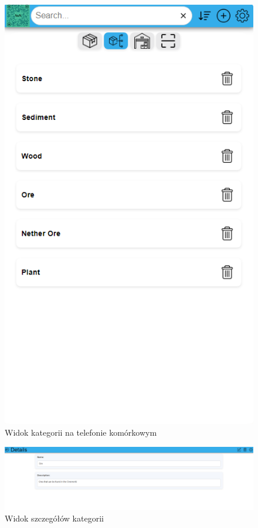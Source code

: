 \documentclass[../main.tex]{subfiles}
\begin{document}
            \begin{figure}[H]
                \centering
                \includegraphics[height=\getImageHeight]{images/app-mobile/app-categories-mobile.png}
                \caption{Widok kategorii na telefonie komórkowym}
                \label{fig:app-categories-mobile}
            \end{figure}

            \begin{figure}[H]
                \centering
                \includegraphics[width=\getImageWidth]{images/app-desktop/app-categories-details-desktop.png}
                \caption{Widok szczegółów kategorii}
                \label{fig:app-categories-details-desktop}
            \end{figure}
\end{document}
